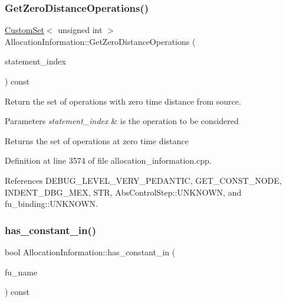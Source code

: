 \subsubsection{\texorpdfstring{Get\+Zero\+Distance\+Operations()}{GetZeroDistanceOperations()}}
{\footnotesize\ttfamily \hyperlink{custom__set_8hpp_a615bc2f42fc38a4bb1790d12c759e86f}{Custom\+Set}$<$ unsigned int $>$ Allocation\+Information\+::\+Get\+Zero\+Distance\+Operations (\begin{DoxyParamCaption}\item[{const unsigned int}]{statement\+\_\+index }\end{DoxyParamCaption}) const\hspace{0.3cm}{\ttfamily [private]}}



Return the set of operations with zero time distance from source. 


\begin{DoxyParams}{Parameters}
{\em statement\+\_\+index} & is the operation to be considered \\
\hline
\end{DoxyParams}
\begin{DoxyReturn}{Returns}
the set of operations at zero time distance 
\end{DoxyReturn}


Definition at line 3574 of file allocation\+\_\+information.\+cpp.



References D\+E\+B\+U\+G\+\_\+\+L\+E\+V\+E\+L\+\_\+\+V\+E\+R\+Y\+\_\+\+P\+E\+D\+A\+N\+T\+IC, G\+E\+T\+\_\+\+C\+O\+N\+S\+T\+\_\+\+N\+O\+DE, I\+N\+D\+E\+N\+T\+\_\+\+D\+B\+G\+\_\+\+M\+EX, S\+TR, Abs\+Control\+Step\+::\+U\+N\+K\+N\+O\+WN, and fu\+\_\+binding\+::\+U\+N\+K\+N\+O\+WN.

\mbox{\label{classAllocationInformation_a7ac88f38f763c08036251efa88ba041b}} 
\subsubsection{\texorpdfstring{has\+\_\+constant\+\_\+in()}{has\_constant\_in()}}
{\footnotesize\ttfamily bool Allocation\+Information\+::has\+\_\+constant\+\_\+in (\begin{DoxyParamCaption}\item[{unsigned int}]{fu\+\_\+name }\end{DoxyParamCaption}) const}



